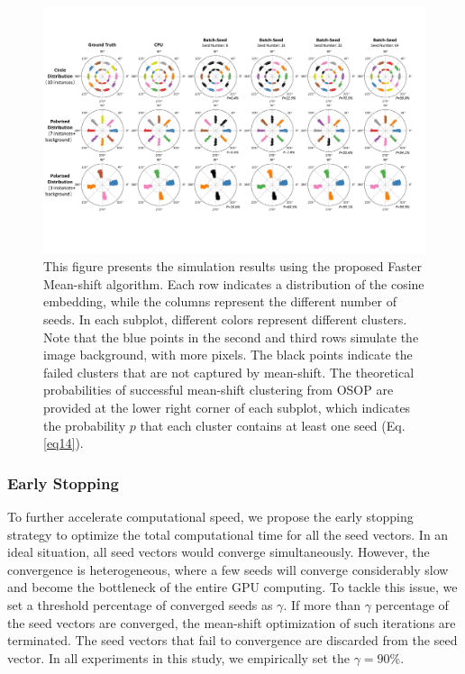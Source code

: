 \documentclass[journal,twoside,web]{ieeecolor}
\begin{document}
\begin{figure}[t]
\includegraphics[width=6.5 in]{4.pdf}
\centering
\caption{This figure presents the simulation results using the proposed Faster Mean-shift algorithm. Each row indicates a distribution of the cosine embedding, while the columns represent the different number of seeds. In each subplot, different colors represent different clusters. Note that the blue points in the second and third rows simulate the image background, with more pixels. The black points indicate the failed clusters that are not captured by mean-shift. The theoretical probabilities of successful mean-shift clustering from OSOP are provided at the lower right corner of each subplot, which indicates the probability $p$ that each cluster contains at least one seed (Eq. \eqref{eq14}).}
\label{fig4}
\end{figure}

\subsubsection{Early Stopping}
To further accelerate computational speed, we propose the early stopping strategy to optimize the total computational time for all the seed vectors. In an ideal situation, all seed vectors would converge simultaneously. However, the convergence is heterogeneous, where a few seeds will converge considerably slow and become the bottleneck of the entire GPU computing. To tackle this issue, we set a threshold percentage of converged seeds as $\gamma$. If more than $\gamma$ percentage of the seed vectors are converged, the mean-shift optimization of such iterations are terminated. The seed vectors that fail to convergence are discarded from the seed vector. In all experiments in this study, we empirically set the $\gamma=90\%$.
\end{document}
